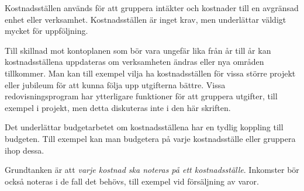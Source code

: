 Kostnadsställen används för att gruppera intäkter och kostnader till en avgränsad enhet eller verksamhet. Kostnadsställen är inget krav, men underlättar väldigt mycket för uppföljning.

Till skillnad mot kontoplanen som bör vara ungefär lika från år till år kan kostnadsställena uppdateras om verksamheten ändras eller nya områden tillkommer. Man kan till exempel vilja ha kostnadsställen för vissa större projekt eller jubileum för att kunna följa upp utgifterna bättre. Vissa redovisningsprogram har ytterligare funktioner för att gruppera utgifter, till exempel i projekt, men detta diskuteras inte i den här skriften.

Det underlättar budgetarbetet om kostnadsställena har en tydlig koppling till budgeten. Till exempel kan man budgetera på varje kostnadsställe eller gruppera ihop dessa.

Grundtanken är att \emph{varje kostnad ska noteras på ett kostnadsställe}. Inkomster bör också noteras i de fall det behövs, till exempel vid försäljning av varor.

